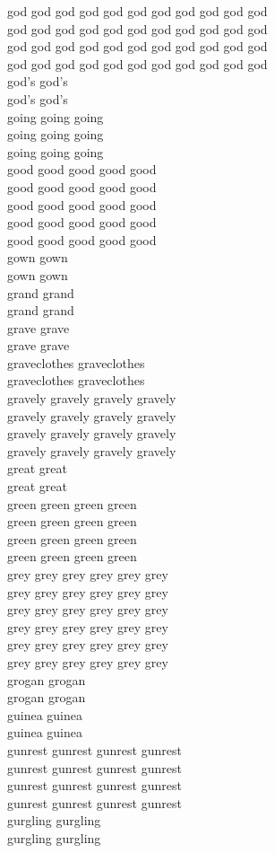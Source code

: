 god god god god god god god god god god god\\
god god god god god god god god god god god\\
god god god god god god god god god god god\\
god god god god god god god god god god god\\
god's god's\\
god's god's\\
going going going\\
going going going\\
going going going\\
good good good good good\\
good good good good good\\
good good good good good\\
good good good good good\\
good good good good good\\
gown gown\\
gown gown\\
grand grand\\
grand grand\\
grave grave\\
grave grave\\
graveclothes graveclothes\\
graveclothes graveclothes\\
gravely gravely gravely gravely\\
gravely gravely gravely gravely\\
gravely gravely gravely gravely\\
gravely gravely gravely gravely\\
great great\\
great great\\
green green green green\\
green green green green\\
green green green green\\
green green green green\\
grey grey grey grey grey grey\\
grey grey grey grey grey grey\\
grey grey grey grey grey grey\\
grey grey grey grey grey grey\\
grey grey grey grey grey grey\\
grey grey grey grey grey grey\\
grogan grogan\\
grogan grogan\\
guinea guinea\\
guinea guinea\\
gunrest gunrest gunrest gunrest\\
gunrest gunrest gunrest gunrest\\
gunrest gunrest gunrest gunrest\\
gunrest gunrest gunrest gunrest\\
gurgling gurgling\\
gurgling gurgling\\


